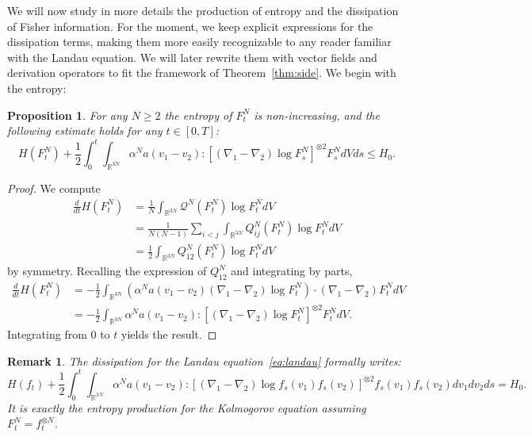 \documentclass[11pt,a4paper]{article}
\theoremstyle{definition}
\theoremstyle{plain}
\newtheorem{prop}[defi]{Proposition}
\newtheorem{remark}[defi]{Remark}
\begin{document}
We will now study in more details the production of entropy and the dissipation of Fisher information. For the moment, we keep explicit expressions for the dissipation terms, making them more easily recognizable to any reader familiar with the Landau equation. We will later rewrite them with vector fields and derivation operators to fit the framework of Theorem~\ref{thm:side}. We begin with the entropy:
\begin{prop}
\label{prop:entropy_dissipation}
For any $N\geq 2$ the entropy of $F^N_t$ is non-increasing, and the following estimate holds for any $t\in[0,T]$:
$$H(F^N_t)+\frac{1}{2}\int_0^t \int_{\mathbb{R}^{3N}}\alpha^N a(v_1-v_2):\left[ (\nabla_1 -\nabla_2) \log F^N_s\right]^{\otimes 2} F^N_s dV ds\leq H_0.$$
\end{prop}
\begin{proof}
    We compute
    \begin{align*}
        \frac{d}{dt}H(F^N_t) &= \frac{1}{N}\int_{\mathbb{R}^{3N}} \mathcal{Q}^N( F^N_t) \log F^N_t dV\\
        &=\frac{1}{N(N-1)}\sum_{i<j}\int_{\mathbb{R}^{3N}} Q^N_{ij}( F^N_t) \log F^N_t dV\\
        &=\frac{1}{2}\int_{\mathbb{R}^{3N}} Q^N_{12}( F^N_t) \log F^N_t dV
    \end{align*}
    by symmetry. Recalling the expression of $Q^N_{12}$ and integrating by parts,
    \begin{align*}
        \frac{d}{dt}H(F^N_t) &=-\frac{1}{2}\int_{\mathbb{R}^{3N}} \left(\alpha^N a(v_1-v_2) (\nabla_1 -\nabla_2) \log F^N_t\right)\cdot  (\nabla_1 -\nabla_2) F^N_tdV\\
        &=-\frac{1}{2}\int_{\mathbb{R}^{3N}} \alpha^N a(v_1-v_2):\left[ (\nabla_1 -\nabla_2) \log F^N_t\right]^{\otimes 2} F^N_tdV.
    \end{align*}
    Integrating from $0$ to $t$ yields the result.
\end{proof}
\begin{remark}
    The dissipation for the Landau equation~\eqref{eq:landau} formally writes:
    $$H(f_t)+\frac{1}{2}\int_0^t \int_{\mathbb{R}^{3N}}\alpha^N a(v_1-v_2):\left[ (\nabla_1 -\nabla_2) \log f_s(v_1)f_s(v_2) \right]^{\otimes 2} f_s(v_1)f_s(v_2) dv_1dv_2 ds = H_0.$$
    It is exactly the entropy production for the Kolmogorov equation assuming $F_t^N=f_t^{\otimes N}$.
\end{remark}
\end{document}
